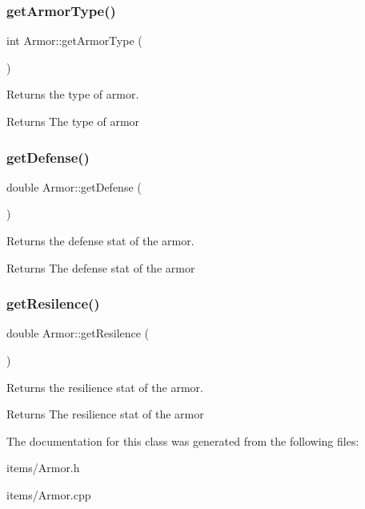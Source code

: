 \subsubsection{\texorpdfstring{getArmorType()}{getArmorType()}}
{\footnotesize\ttfamily int Armor\+::get\+Armor\+Type (\begin{DoxyParamCaption}{ }\end{DoxyParamCaption})}



Returns the type of armor. 

\begin{DoxyReturn}{Returns}
The type of armor 
\end{DoxyReturn}
\mbox{\label{class_armor_a8966e94744b502fb5f6448128d38aa9b}} 
\subsubsection{\texorpdfstring{getDefense()}{getDefense()}}
{\footnotesize\ttfamily double Armor\+::get\+Defense (\begin{DoxyParamCaption}{ }\end{DoxyParamCaption})}



Returns the defense stat of the armor. 

\begin{DoxyReturn}{Returns}
The defense stat of the armor 
\end{DoxyReturn}
\mbox{\label{class_armor_ac4fa477fa4bb6530e6e2620e823b5bea}} 
\subsubsection{\texorpdfstring{getResilence()}{getResilence()}}
{\footnotesize\ttfamily double Armor\+::get\+Resilence (\begin{DoxyParamCaption}{ }\end{DoxyParamCaption})}



Returns the resilience stat of the armor. 

\begin{DoxyReturn}{Returns}
The resilience stat of the armor 
\end{DoxyReturn}


The documentation for this class was generated from the following files\+:\begin{DoxyCompactItemize}
\item 
items/Armor.\+h\item 
items/Armor.\+cpp\end{DoxyCompactItemize}
